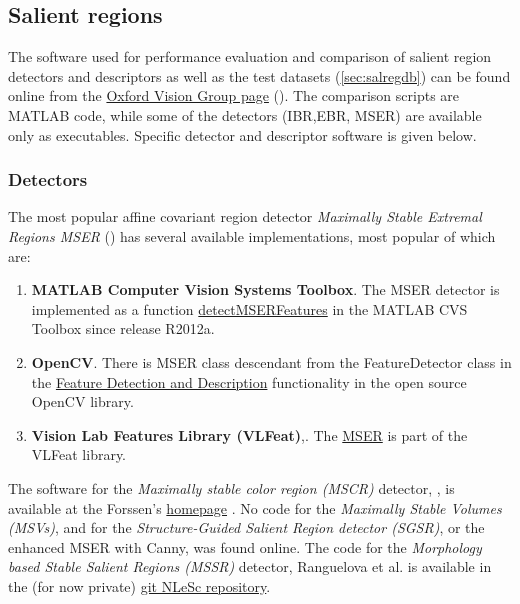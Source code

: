 \subsection{Salient regions}\label{soft:salreg:sec}

{The software used for performance evaluation and comparison of salient region detectors and descriptors \cite{Mikolajczyk:2005} as well as the test datasets (\ref{sec:salregdb}) can be found online from the \href{http://www.robots.ox.ac.uk/~vgg/research/affine/index.html}{Oxford Vision Group page} (\cite{vgg_soft_data}). The comparison scripts are MATLAB code, while some of the detectors (IBR,EBR, MSER) are available only as executables. Specific detector and descriptor software is given below.

\subsubsection{Detectors}\label{soft:salregdet:subsec}

The most popular affine covariant region detector {\em Maximally Stable Extremal Regions MSER} (\cite{Matas2002BMVC}) has several available implementations, most popular of which are:
\begin{enumerate}
\item{\bf MATLAB Computer Vision Systems Toolbox}. The MSER detector is implemented as a function \href{http://nl.mathworks.com/help/vision/ref/detectmserfeatures.html}{\textsf{detectMSERFeatures}} in the MATLAB CVS Toolbox since release R2012a. 
\item{\bf OpenCV}. There is MSER class descendant from the \textsf{FeatureDetector} class in the \href{http://docs.opencv.org/modules/features2d/doc/feature_detection_and_description.html}{Feature Detection and Description} functionality in the open source OpenCV library.
\item{\bf Vision Lab Features Library (VLFeat)},\cite{vlfeat_soft}. The \href{http://www.vlfeat.org/api/mser.html}{MSER} is part of the VLFeat library.
\end{enumerate}
The software for the  {\em Maximally stable color region (MSCR)} detector, \cite{Forssen07}, is available at the Forssen's \href{http://www.cs.ubc.ca/~perfo/mscr/}{homepage} \cite{forssen07_soft}.
No code for the {\em Maximally Stable Volumes (MSVs)}, \cite{DonoserB06} and for the {\em Structure-Guided Salient Region detector (SGSR)}, \cite{Fan08} or the enhanced MSER with Canny,\cite{Wang14}  was found online.
The code for the  {\em Morphology based Stable Salient Regions (MSSR) } detector, Ranguelova et al. \cite{RangMSSR06, RangHumpb06} is available in the (for now private) \href{https://github.com/NLeSC/LargeScaleImaging/tree/master/Software}{git NLeSc repository}.

}
